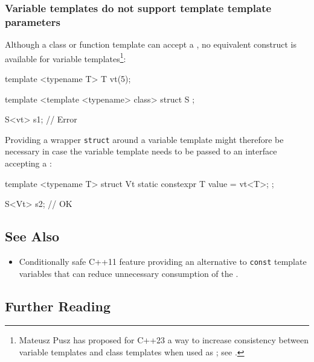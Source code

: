 \subsubsection[Variable templates do not support template template parameters]{Variable templates do not support template template parameters}\label{variable-templates-do-not-support-template-template-parameters}

Although a class or function template can accept a
, no equivalent
construct is available for variable templates{\cprotect\footnote{Mateusz Pusz has proposed for C++23 a way to increase consistency between
variable templates and class templates when used as ; see \cite{pusz20}.}}:

\begin{emcppslisting}[emcppsbatch=e7]
template <typename T> T vt(5);

template <template <typename> class>
struct S { };

S<vt> s1;  // Error
\end{emcppslisting}

\noindent Providing a wrapper \lstinline!struct!
around a variable template might therefore be necessary in case the variable template needs to be passed to an interface
accepting a :

\begin{emcppslisting}[emcppsbatch=e7]
template <typename T>
struct Vt { static constexpr T value = vt<T>; };

S<Vt> s2;  // OK
\end{emcppslisting}


\subsection[See Also]{See Also}\label{see-also}

\begin{itemize}
\item{%
Conditionally safe C++11 feature providing an alternative to \lstinline!const! template variables that can reduce unnecessary consumption of the .}
\end{itemize}

\subsection[Further Reading]{Further Reading}\label{further-reading}

\hspace*{\fill}


